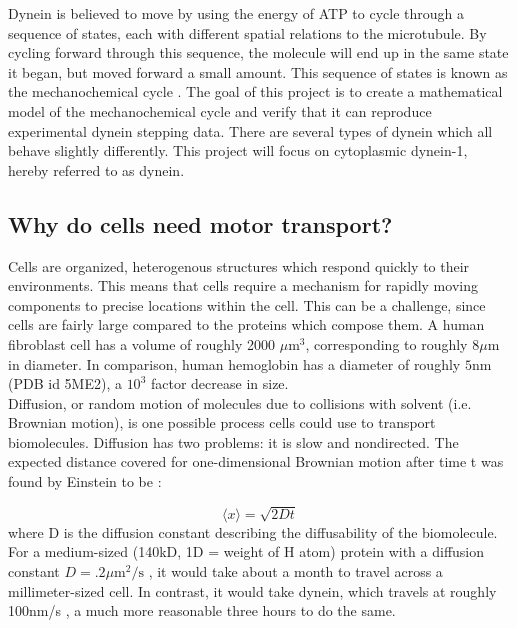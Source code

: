 \documentclass[
11pt, %
english, %
singlespacing, %
headsepline, %
chapterinoneline, %
]{MastersDoctoralThesis} %
\begin{document}
Dynein is believed to move by using the energy of ATP to cycle through a sequence of states, each with different spatial relations to the microtubule. By cycling forward through this sequence, the molecule will end up in the same state it began, but moved forward a small amount. This sequence of states is known as the mechanochemical cycle \cite{cianfroccoreview}. The goal of this project is to create a mathematical model of the mechanochemical cycle and verify that it can reproduce experimental dynein stepping data. There are several types of dynein which all behave slightly differently. This project will focus on cytoplasmic dynein-1, hereby referred to as dynein.\\

\subsection{Why do cells need motor transport?}
Cells are organized, heterogenous structures which respond quickly to their environments. This means that cells require a mechanism for rapidly moving components to precise locations within the cell. This can be a challenge, since cells are fairly large compared to the proteins which compose them. A human fibroblast cell has a volume of roughly 2000 $\mu\text{m}^3$\cite{fibroblastvolume}, corresponding to roughly $8 \mu \text{m}$ in diameter. In comparison, human hemoglobin has a diameter of roughly $5 \text{nm}$ (PDB id 5ME2), a $10^3$ factor decrease in size.\\

Diffusion, or random motion of molecules due to collisions with solvent (i.e. Brownian motion), is one possible process cells could use to transport biomolecules. Diffusion has two problems: it is slow and nondirected. The expected distance covered for one-dimensional Brownian motion after time t was found by Einstein to be \cite{einstein-paper}:

\begin{equation}
  \label{diffusion-equation}
  \langle x\rangle = \sqrt{2Dt}
\end{equation}
%
where D is the diffusion constant describing the diffusability of the biomolecule. For a medium-sized (140kD, 1D = weight of H atom) protein with a diffusion constant $D = .2 \mu \text{m}^2/\text{s}$ \cite{diffusionconstants}, it would take about a month to travel across a millimeter-sized cell. In contrast, it would take dynein, which travels at roughly 100nm/s \cite{weihongpaper}, a much more reasonable three hours to do the same. \\%
\end{document}
